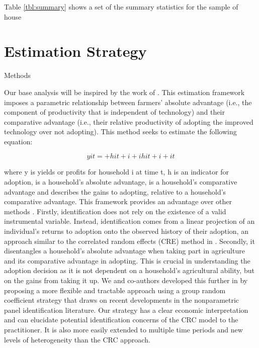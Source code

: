 \documentclass{article}
\begin{document}
Table \ref{tbl:summary} shows a set of the summary statistics for the sample of house

\section{Estimation Strategy}

Methods 

Our base analysis will be inspired by the work of \citep{Suri2011-oi}. This estimation framework imposes a parametric relationship between farmers' absolute advantage (i.e., the component of productivity that is independent of technology) and their comparative advantage (i.e., their relative productivity of adopting the improved technology over not adopting). This method seeks to estimate the following equation:

$$
yit=+ hit + i+ihit + i+it
$$

where y is yields or profits for household i at time t, h is an indicator for adoption,  is a household’s absolute advantage,  is a household’s comparative advantage and  describes the gains to adopting, relative to a household’s comparative advantage. This framework provides an advantage over other methods \citep{Wooldridge1997-xj,Heckman1998-pt}. Firstly, identification does not rely on the existence of a valid instrumental variable. Instead, identification comes from a linear projection of an individual's returns to adoption onto the observed history of their adoption, an approach similar to the correlated random effects (CRE) method in \citep{Chamberlain1984-uk}. Secondly, it disentangles a household’s absolute advantage when taking part in agriculture and its comparative advantage in adopting. This is crucial in understanding the adoption decision as it is not dependent on a household’s agricultural ability, but on the gains from taking it up. We and co-authors developed this further in \citep{Tjernstrom_Emilia_Dalia_Ghanem_Oscar_Barriga_Cabanillas_Travis_J_Lybbert_Jeffrey_D_Michler_and_Aleksandr_Michuda2020-bc} by proposing a more flexible and tractable approach using a group random coefficient strategy that draws on recent developments in the nonparametric panel identification literature. Our strategy has a clear economic interpretation and can elucidate potential identification concerns of the CRC model to the practitioner. It is also more easily extended to multiple time periods and new levels of heterogeneity than the CRC approach.
\end{document}
